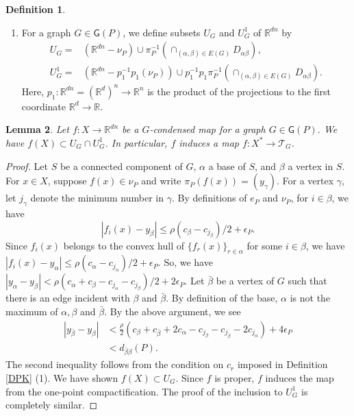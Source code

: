 \documentclass[reqno]{amsart}
\theoremstyle{definition}
\newtheorem{defi}{Definition}[section]
\theoremstyle{plain}
\newtheorem{lem}[defi]{Lemma}
\newcommand{\eps}{\epsilon}
\newcommand{\TT}{\mathcal{T}} %
\newcommand{\GG}{\mathsf{G}}%
\newcommand{\RR}{\mathbb{R}}
\begin{document}
\begin{defi}
\begin{enumerate}
\[\begin{array}{cc}
x & (i\sim_G1)\\
y & (\text{otherwise}).
\end{array}\right.
\]
Clearly, $f_G$ is $G$-condensed, and a vertex is a base if it satisfies the condition (b) on a base. At least, the minimum and the second to minimum vertices of each connected component $\subset P^\circ$ are  bases.
\item For a graph $G\in \GG(P)$, we define subsets $U_G$ and $U^1_G$ of $\RR^{dn}$ by
\[
\begin{split}
U_G=&(\RR^{dn}-\nu_{P})\cup \pi_P^{-1}(\cap_{(\alpha,\beta)\in E(G)}D_{\alpha\beta}), \\
U_G^1=&(\RR^{dn}-p_1^{-1}p_1(\nu_P))\cup p_1^{-1} p_1\pi_P^{-1}(\cap_{(\alpha,\beta)\in E(G)}D_{\alpha\beta}).
\end{split}
\]
Here, $p_1:\RR^{dn}=(\RR^d)^n\to \RR^n$ is  the product of the projections to the first coordinate $\RR^d\to \RR$.
\end{enumerate}
\end{defi}


\begin{lem}\label{Lcondensed}
Let $f:X\to \RR^{dn}$ be a $G$-condensed map for a graph $G\in \GG(P)$. We have $f(X) \subset U_G\cap U^1_G$. In particular, $f$ induces a map $f:X^*\to \TT_G$.
\end{lem}
\begin{proof}
Let $S$ be a connected component of $G$,  $\alpha$ a base of $S$, and  $\beta$  a vertex in $S$.  For $x\in X$, suppose  $f(x)\in \nu_P$ and write $\pi_P(f(x))=(y_\gamma)$.   For a vertex $\gamma$, let $j_\gamma$ denote the minimum number in $\gamma$. By definitions of $e_P$ and $\nu_P$, for $i\in \beta$, we have
\[
|f_i(x)-y_\beta|\leq \rho (c_\beta-c_{j_\beta})/2+\eps_P.
\]
Since $f_i(x)$ belongs to the convex hull of $\{f_r(x)\}_{r\in \alpha}$ for some $i\in \beta$, we have 
$
|f_i(x)-y_\alpha|\leq \rho (c_\alpha-c_{j_\alpha})/2+\eps_P.
$
So, we have $|y_\alpha-y_\beta|<\rho (c_\alpha+c_\beta-c_{j_\alpha}-c_{j_\beta})/2+2\eps_P$. Let $\bar \beta$ be a vertex of $G$ such that there is an edge incident with $\beta$ and $\bar\beta$. By definition of the base, $\alpha$ is not the maximum of $\alpha, \beta$ and $\bar \beta$. By the above argument, 
we see 
\[
\begin{split}
|y_{\bar \beta}-y_\beta|&<\frac{\rho}{2}(c_\beta+c_{\bar \beta}+2c_\alpha-c_{j_\beta}-c_{j_{\bar \beta}}-2c_{j_\alpha})+4\eps_P\\
&<d_{\bar\beta\beta}(P).
\end{split}
\] The second inequality follows from  the condition on $c_r$ imposed in Definition \ref{DPK} (1). We have shown $f(X)\subset U_G$. Since $f$ is proper, $f$ induces the map from the one-point compactification. The proof of the inclusion to $U^1_G$ is completely similar. 
\end{proof}
\end{document}
